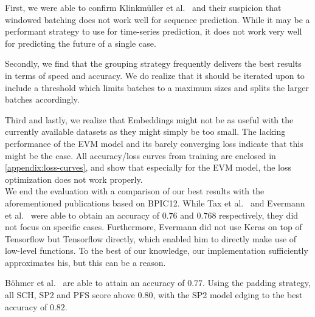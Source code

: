 First, we were able to confirm Klinkmüller et al.~\cite{klinkmuller2018reliablemonitoring} and their suspicion that windowed batching does not work well for sequence prediction. While it may be a performant strategy to use for time-series prediction, it does not work very well for predicting the future of a single case.

Secondly, we find that the grouping strategy frequently delivers the best results in terms of speed and accuracy. We do realize that it should be iterated upon to include a threshold which limits batches to a maximum sizes and splits the larger batches accordingly.

Third and lastly, we realize that Embeddings might not be as useful with the currently available datasets as they might simply be too small. The lacking performance of the EVM model and its barely converging loss indicate that this might be the case. All accuracy/loss curves from training are enclosed in \autoref{appendix:loss-curves}, and show that especially for the EVM model, the loss optimization does not work properly.\\

We end the evaluation with a comparison of our best results with the aforementioned publications based on BPIC12. While Tax et al.~\cite{tax2017} and Evermann et al.~\cite{evermann2016} were able to obtain an accuracy of $0.76$ and $0.768$ respectively, they did not focus on specific cases. Furthermore, Evermann did not use Keras on top of Tensorflow but Tensorflow directly, which enabled him to directly make use of low-level functions. To the best of our knowledge, our implementation sufficiently approximates his, but this can be a reason.

Böhmer et al.~\cite{boehmer2018probability} are able to attain an accuracy of $0.77$. Using the padding strategy, all SCH, SP2 and PFS score above $0.80$, with the SP2 model edging to the best accuracy of $0.82$.
